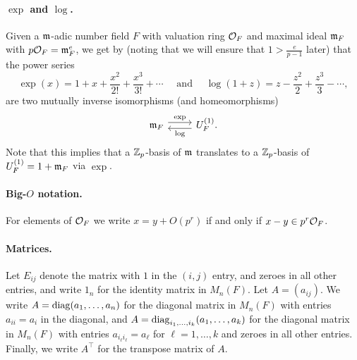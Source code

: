 \paragraph{$\exp$ and $\log$.} Given a $\mathfrak{m}$-adic number field $F$ with valuation ring $\mathcal{O}_{F}$ and maximal ideal $\mathfrak{m}_{F}$ with $p\mathcal{O}_{F} = \mathfrak{m}_{F}^{e}$, we get by \cite[Prop.~(5.5)]{Neukirch} (noting that we will ensure that $1 > \frac{e}{p-1}$ later) that the power series
\begin{equation*}
  \exp(x) = 1 + x + \frac{x^{2}}{2!} + \frac{x^{3}}{3!} + \dotsb \quad \text{ and } \quad \log(1+z) = z - \frac{z^{2}}{2} + \frac{z^{3}}{3} - \dotsb,
\end{equation*}
are two mutually inverse isomorphisms (and homeomorphisms)
\[
  \begin{tikzcd}
    \idm_{F} \ar[r, yshift=0.7ex, "\exp"] & U_{F}^{(1)}. \ar[l, yshift=-0.7ex, "\log"]
  \end{tikzcd}
\]
Note that this implies that a $\mathbb{Z}_{p}$-basis of $\mathfrak{m}$ translates to a $\mathbb{Z}_{p}$-basis of $U_{F}^{(1)} = 1+\mathfrak{m}_{F}$ via $\exp$.

\paragraph{Big-$O$ notation.} For elements of $\mathcal{O}_{F}$ we write $x = y + O(p^{r})$ if and only if $x-y \in p^{r}\mathcal{O}_{F}$.

\paragraph{Matrices.} Let $E_{ij}$ denote the matrix with $1$ in the $(i,j)$ entry, and zeroes in all other entries, and write $1_{n}$ for the identity matrix in $M_{n}(F)$. Let $A = (a_{ij})$. We write $A = \operatorname{diag}(a_{1},\dotsc,a_{n})$ for the diagonal matrix in $M_{n}(F)$ with entries $a_{ii}=a_{i}$ in the diagonal, and $A = \operatorname{diag}_{i_{1},\dotsc,i_{k}}(a_{1},\dotsc,a_{k})$ for the diagonal matrix in $M_{n}(F)$ with entries $a_{i_{\ell}i_{\ell}} = a_{\ell}$ for $\ell = 1,\dotsc,k$ and zeroes in all other entries. Finally, we write $A^{\top}$ for the transpose matrix of $A$.

